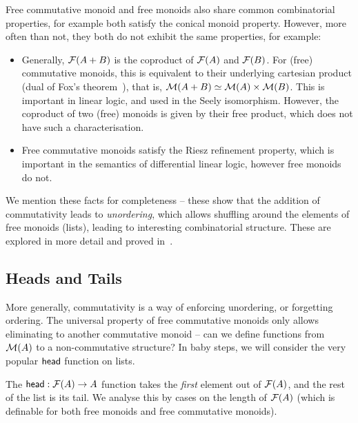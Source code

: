 Free commutative monoid and free monoids also share common combinatorial properties, for example both satisfy the
conical monoid property.
%
However, more often than not, they both do not exhibit the same properties, for example:
\begin{itemize}
    \item
        Generally, $\mathcal{F}(A + B)$ is the coproduct of $\mathcal{F}(A)$ and $\mathcal{F}(B)$.
        For (free) commutative monoids, this is equivalent to
        their underlying cartesian product
          (dual of Fox's theorem~\cite{foxCoalgebrasCartesianCategories1976}),
          that is, $\mathcal{M}(A + B) \mathrel{\simeq} \mathcal{M}(A) \times \mathcal{M}(B)$.
          This is important in linear logic, and used in the Seely isomorphism.
          However, the coproduct of two (free) monoids is given by their free product,
          which does not have such a characterisation.
    \item Free commutative monoids satisfy the Riesz refinement property,
          which is important in the semantics of differential linear logic,
          however free monoids do not.
\end{itemize}
We mention these facts for completeness -- these show that the addition of commutativity leads to \emph{unordering},
which allows shuffling around the elements of free monoids (lists), leading to interesting combinatorial structure.
%
These are explored in more detail and proved in~\cite{choudhuryFreeCommutativeMonoids2023}.

\subsection{Heads and Tails}\label{sec:head}

More generally, commutativity is a way of enforcing unordering, or forgetting ordering.
%
The universal property of free commutative monoids only allows eliminating to another commutative monoid --
can we define functions from $\mathcal{M}(A)$ to a non-commutative structure?
%
In baby steps, we will consider the very popular $\operatorname{\mathsf{head}}$ function on lists.

The $\operatorname{\mathsf{head}} : \mathcal{F}(A) \to A$ function takes the \emph{first} element out of $\mathcal{F}(A)$, and the rest of the list is
its tail.
%
We analyse this by cases on the length of $\mathcal{F}(A)$
(which is definable for both free monoids and free commutative monoids).

